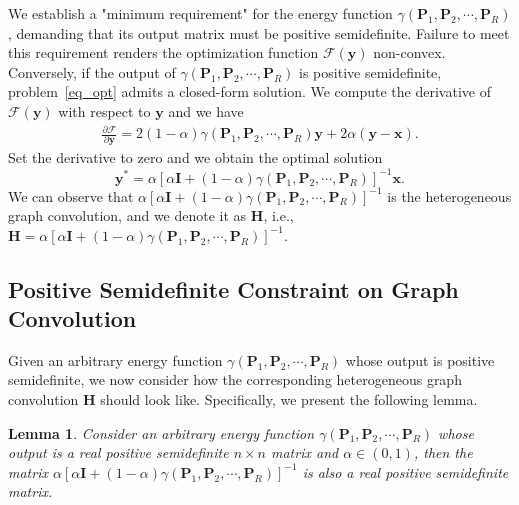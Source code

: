 \documentclass{article}
\newtheorem{lemma}{Lemma}[section]
\begin{document}
We establish a "minimum requirement" for the energy function $\gamma(\mathbf{P}_1,\mathbf{P}_2,\cdots,\mathbf{P}_R)$, demanding that its output matrix must be positive semidefinite. Failure to meet this requirement renders the optimization function $\mathcal{F}(\mathbf{y})$ non-convex. Conversely, if the output of $\gamma(\mathbf{P}_1,\mathbf{P}_2,\cdots,\mathbf{P}_R)$ is positive semidefinite, problem~\eqref{eq_opt} admits a closed-form solution. We compute the derivative of $\mathcal{F}(\mathbf{y})$ with respect to $\mathbf{y}$ and we have
\begin{equation}
    \begin{split}
        \frac{\partial\mathcal{F}}{\partial\mathbf{y}}= 2(1-\alpha) \gamma(\mathbf{P}_1,\mathbf{P}_2,\cdots,\mathbf{P}_R) \mathbf{y}+2\alpha \left(\mathbf{y}-\mathbf{x} \right).
    \end{split}
\end{equation}
Set the derivative to zero and we obtain the optimal solution
\begin{equation}
\label{opt-re}
    \mathbf{y}^{\ast}=\alpha \left[ \alpha\mathbf{I}+(1-\alpha)\gamma(\mathbf{P}_1,\mathbf{P}_2,\cdots,\mathbf{P}_R) \right]^{-1}\mathbf{x}.
\end{equation}
We can observe that $\alpha \left[ \alpha\mathbf{I}+(1-\alpha)\gamma(\mathbf{P}_1,\mathbf{P}_2,\cdots,\mathbf{P}_R) \right]^{-1}$ is the heterogeneous graph convolution, and we denote it as $\mathbf{H}$, i.e., $\mathbf{H} = \alpha \left[ \alpha\mathbf{I}+(1-\alpha)\gamma(\mathbf{P}_1,\mathbf{P}_2,\cdots,\mathbf{P}_R) \right]^{-1}$.

\subsection{Positive Semidefinite Constraint on Graph Convolution}
Given an arbitrary energy function $\gamma(\mathbf{P}_1,\mathbf{P}_2,\cdots,\mathbf{P}_R)$ whose output is positive semidefinite, we now consider how the corresponding heterogeneous graph convolution $\mathbf{H}$ should look like. Specifically, we present the following lemma.
\begin{lemma}
\label{lemma}
Consider an arbitrary energy function $\gamma(\mathbf{P}_1,\mathbf{P}_2,\cdots,\mathbf{P}_R)$ whose output is a real positive semidefinite $n \times n$ matrix and $\alpha \in (0,1)$, then the matrix $\alpha \left[ \alpha\mathbf{I}+(1-\alpha)\gamma(\mathbf{P}_1,\mathbf{P}_2,\cdots,\mathbf{P}_R) \right]^{-1}$ is also a real positive semidefinite  matrix.
\end{lemma}
\end{document}
